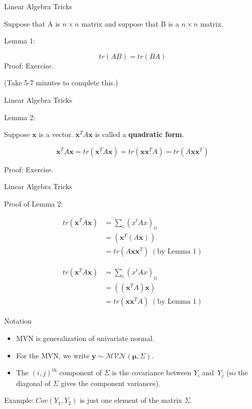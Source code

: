 \documentclass[
  ignorenonframetext,
]{beamer}
\newcommand{\bmu}{\bm{\mu}}
\begin{document}
\begin{frame}{Linear Algebra Tricks}
\protect\hypertarget{linear-algebra-tricks}{}

Suppose that A is \(n \times n\) matrix and suppose that B is a
\(n \times n\) matrix.

Lemma 1:

\[tr(AB) = tr(BA)\] Proof: Exercise.

(Take 5-7 minutes to complete this.)

\end{frame}

\begin{frame}{Linear Algebra Tricks}
\protect\hypertarget{linear-algebra-tricks-1}{}

Lemma 2:

Suppose \(\bm{x}\) is a vector. \(\bm{x}^TA\bm{x}\) is called a
\textbf{quadratic form}.

\[\bm{x}^TA\bm{x} = tr(\bm{x}^TA\bm{x}) = tr(\bm{x}\bm{x}^TA) = tr(A\bm{x}\bm{x}^T)\]

Proof: Exercise.

\end{frame}

\begin{frame}{Linear Algebra Tricks}
\protect\hypertarget{linear-algebra-tricks-2}{}

Proof of Lemma 2:

\begin{align}
tr({\bm{x}^TA\bm{x}})  
&= \sum_i (x^tAx)_{ii} \\ 
& = (\bm{x}^T(A\bm{x})) \\
& = tr(A\bm{x}\bm{x}^T) \; (\text{by Lemma 1})
\end{align}

\begin{align}
tr({\bm{x}^TA\bm{x}})  
&= \sum_i (x^tAx)_{ii} \\ 
& = ((\bm{x}^TA)\bm{x}) \\
& = tr(\bm{x}\bm{x}^TA)\; (\text{by Lemma 1})
\end{align}

\end{frame}

\begin{frame}{Notation}
\protect\hypertarget{notation}{}

\begin{itemize}
\item MVN is generalization of univariate normal.
\item For the MVN, we write $\bm{y} \sim
\mathcal{MVN}(\bmu,\Sigma)$. 
\item The $(i,j)^{\text{th}}$
component of $\Sigma$ is the covariance between $Y_i$ and~$Y_j$ (so
the diagonal of $\Sigma$ gives the component variances).
\end{itemize}

Example: \(Cov(Y_1, Y_2)\) is just one element of the matrix \(\Sigma.\)

\end{frame}
\end{document}
